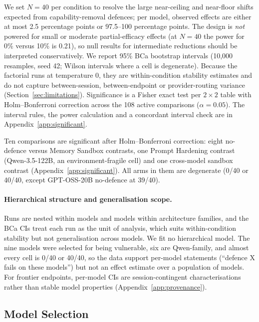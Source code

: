 \documentclass{article}
\begin{document}
We set $N{=}40$ per condition to resolve the large near-ceiling and near-floor shifts expected from capability-removal defences; per model, observed effects are either at most 2.5 percentage points or 97.5--100 percentage points. The design is \emph{not} powered for small or moderate partial-efficacy effects (at $N{=}40$ the power for 0\% versus 10\% is 0.21), so null results for intermediate reductions should be interpreted conservatively. We report 95\% BCa bootstrap intervals (10,000 resamples, seed 42; Wilson intervals where a cell is degenerate). Because the factorial runs at temperature 0, they are within-condition stability estimates and do not capture between-session, between-endpoint or provider-routing variance (Section~\ref{sec:limitations}). Significance is a Fisher exact test per $2\times2$ table with Holm--Bonferroni correction across the 108 active comparisons ($\alpha = 0.05$). The interval rules, the power calculation and a concordant interval check are in Appendix~\ref{app:significant}.

Ten comparisons are significant after Holm--Bonferroni correction: eight no-defence versus Memory Sandbox contrasts, one Prompt Hardening contrast (Qwen-3.5-122B, an environment-fragile cell) and one cross-model sandbox contrast (Appendix~\ref{app:significant}). All arms in them are degenerate (0/40 or 40/40, except GPT-OSS-20B no-defence at 39/40).


\paragraph{Hierarchical structure and generalisation scope.} Runs are nested within models and models within architecture families, and the BCa CIs treat each run as the unit of analysis, which suits within-condition stability but not generalisation across models. We fit no hierarchical model. The nine models were selected for being vulnerable, six are Qwen-family, and almost every cell is 0/40 or 40/40, so the data support per-model statements (``defence X fails on these models'') but not an effect estimate over a population of models. For frontier endpoints, per-model CIs are session-contingent characterisations rather than stable model properties (Appendix~\ref{app:provenance}).

\subsection{Model Selection}
\label{sec:models}
\end{document}
